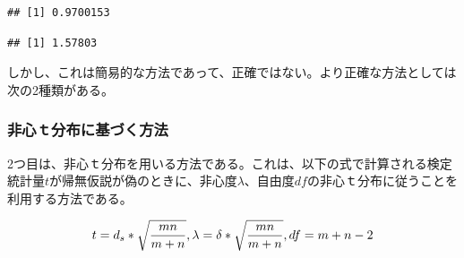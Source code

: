 \documentclass[
  ja=standard, xelatex, base=12pt]{bxjsreport}
\newenvironment{Shaded}{\begin{snugshade}}{\end{snugshade}}
\newcommand{\CommentTok}[1]{\textcolor[rgb]{0.56,0.35,0.01}{\textit{#1}}}
\newcommand{\DecValTok}[1]{\textcolor[rgb]{0.00,0.00,0.81}{#1}}
\newcommand{\FloatTok}[1]{\textcolor[rgb]{0.00,0.00,0.81}{#1}}
\newcommand{\FunctionTok}[1]{\textcolor[rgb]{0.00,0.00,0.00}{#1}}
\newcommand{\NormalTok}[1]{#1}
\newcommand{\OtherTok}[1]{\textcolor[rgb]{0.56,0.35,0.01}{#1}}
\newcommand{\SpecialCharTok}[1]{\textcolor[rgb]{0.00,0.00,0.00}{#1}}
\begin{document}
\begin{Shaded}
\end{Shaded}

\begin{verbatim}
## [1] 0.9700153
\end{verbatim}

\begin{Shaded}
\end{Shaded}

\begin{verbatim}
## [1] 1.57803
\end{verbatim}

しかし、これは簡易的な方法であって、正確ではない。より正確な方法としては次の2種類がある。

\hypertarget{ux975eux5fc3uxff54ux5206ux5e03ux306bux57faux3065ux304fux65b9ux6cd5-1}{%
\subsubsection{非心ｔ分布に基づく方法}\label{ux975eux5fc3uxff54ux5206ux5e03ux306bux57faux3065ux304fux65b9ux6cd5-1}}

2つ目は、非心ｔ分布を用いる方法である。これは、以下の式で計算される検定統計量\(t\)が帰無仮説が偽のときに、非心度\(λ\)、自由度\(df\)の非心ｔ分布に従うことを利用する方法である。

\[
t=d_s*\sqrt{\frac{mn}{m+n}},\\
\lambda=\delta*\sqrt{\frac{mn}{m+n}},\\
df=m+n-2
\]
\end{document}
